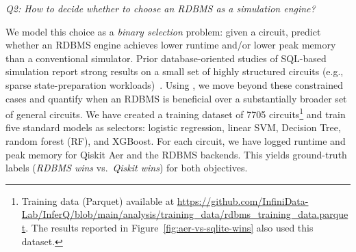 

  \vspace{0.2cm}
\noindent\emph{Q2: How to decide whether to choose an RDBMS as a simulation engine?} %
  \vspace{0.2cm}

We model this choice as a \emph{binary selection} problem: given a circuit, predict
whether an RDBMS engine achieves lower runtime and/or lower peak memory than a
conventional simulator. Prior database-oriented studies of SQL-based simulation report
strong results on a small set of highly structured circuits (e.g., sparse state-preparation
workloads)~\cite{hai2025quantum,einsteinSQL2023}. Using \sys, we move beyond these
constrained cases and quantify when an RDBMS is beneficial over a substantially broader
set of 
general circuits.
%
 We have created a training dataset of \num{7705} circuits\footnote{Training data (Parquet) available at \url{https://github.com/InfiniData-Lab/InferQ/blob/main/analysis/training_data/rdbms_training_data.parquet}. The results reported in Figure~\ref{fig:aer-vs-sqlite-wins} also used this dataset.} and train five standard 
models as selectors: logistic regression,
linear SVM,  Decision Tree, random forest (RF), and XGBoost. 
For each circuit, we have logged runtime and peak
memory for Qiskit Aer and the RDBMS backends. This yields ground-truth labels
(\emph{RDBMS wins} vs.\ \emph{Qiskit wins}) for both objectives.

